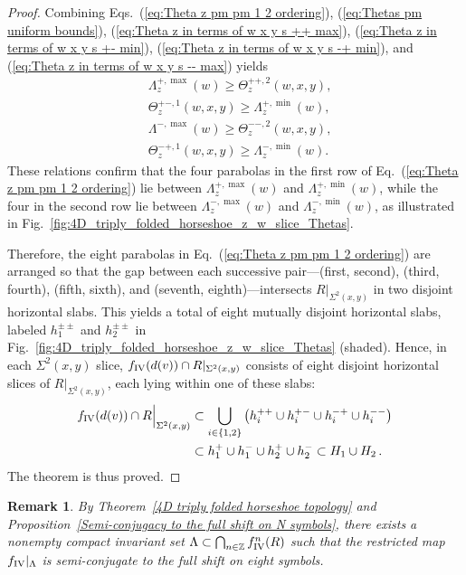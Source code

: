 \documentclass[12pt]{iopart}
\newtheorem*{remark}{Remark}
\begin{document}
\begin{proof}
Combining Eqs.~(\ref{eq:Theta z pm pm 1 2 ordering}), (\ref{eq:Thetas pm uniform bounds}), (\ref{eq:Theta z in terms of w x y s ++ max}), (\ref{eq:Theta z in terms of w x y s +- min}), (\ref{eq:Theta z in terms of w x y s -+ min}), and (\ref{eq:Theta z in terms of w x y s -- max}) yields  
\begin{eqnarray}
&\Lambda^{+,\max}_z(w) \geq \Theta^{++,2}_z(w,x,y), \label{eq:Theta z final bounds 1} \\
&\Theta^{+-,1}_z(w,x,y) \geq \Lambda^{+,\min}_z(w), \label{eq:Theta z final bounds 2} \\
&\Lambda^{-,\max}(w) \geq \Theta^{--,2}_z(w,x,y), \label{eq:Theta z final bounds 3} \\
&\Theta^{-+,1}_z(w,x,y) \geq \Lambda^{-,\min}_z(w). \label{eq:Theta z final bounds 4}
\end{eqnarray}
These relations confirm that the four parabolas in the first row of Eq.~(\ref{eq:Theta z pm pm 1 2 ordering}) lie between \( \Lambda^{+,\max}_z(w) \) and \( \Lambda^{+,\min}_z(w) \), while the four in the second row lie between \( \Lambda^{-,\max}_z(w) \) and \( \Lambda^{-,\min}_z(w) \), as illustrated in Fig.~\ref{fig:4D_triply_folded_horseshoe_z_w_slice_Thetas}.

Therefore, the eight parabolas in Eq.~(\ref{eq:Theta z pm pm 1 2 ordering}) are arranged so that the gap between each successive pair—(first, second), (third, fourth), (fifth, sixth), and (seventh, eighth)—intersects \( R|_{\Sigma^2(x,y)} \) in two disjoint horizontal slabs.  
This yields a total of eight mutually disjoint horizontal slabs, labeled \( h^{\pm\pm}_1 \) and \( h^{\pm\pm}_2 \) in Fig.~\ref{fig:4D_triply_folded_horseshoe_z_w_slice_Thetas} (shaded).  
Hence, in each \( \Sigma^2(x,y) \) slice, \( f_{\rm IV}(d(v)) \cap R|_{\Sigma^2(x,y)} \) consists of eight disjoint horizontal slices of \( R|_{\Sigma^2(x,y)} \), each lying within one of these slabs:  
\begin{eqnarray}\label{eq:V intersects f_V V z w slice final bound}
f_{\rm IV}(d(v))\cap R \Big|_{\Sigma^2(x,y)} 
&\subset \bigcup_{i\in \{1,2\}} \left( h^{++}_i \cup h^{+-}_i \cup h^{-+}_i \cup h^{--}_i \right) \nonumber \\
&\subset h^{+}_1 \cup h^{-}_1 \cup h^{+}_2 \cup h^{-}_2 \subset H_1 \cup H_2 \, .
\end{eqnarray}
The theorem is thus proved.

\end{proof}

\begin{remark}
By Theorem~\ref{4D triply folded horseshoe topology} and Proposition~\ref{Semi-conjugacy to the full shift on N symbols}, there exists a nonempty compact invariant set 
\(\Lambda \subset \bigcap_{n\in\mathbb{Z}} f_{\rm IV}^n(R)\) 
such that the restricted map \( f_{\rm IV}|_{\Lambda} \) is semi-conjugate to the full shift on eight symbols.
\end{remark}
\end{document}

